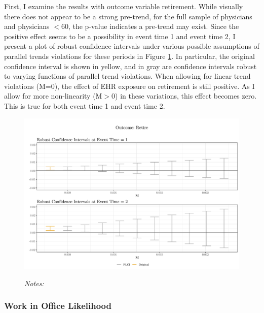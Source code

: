 \documentclass[12pt]{article}
\begin{document}
First, I examine the results with outcome variable retirement. While visually there does not appear to be a strong pre-trend, for the full sample of physicians and physicians $< 60$, the p-value indicates a pre-trend may exist. Since the positive effect seems to be a possibility in event time 1 and event time 2, I present a plot of robust confidence intervals under various possible assumptions of parallel trends violations for these periods in Figure \ref{fig:pre_retire}. In particular, the original confidence interval is shown in yellow, and in gray are confidence intervals robust to varying functions of parallel trend violations. When allowing for linear trend violations (M=0), the effect of EHR exposure on retirement is still positive. As I allow for more non-linearity (M$>$0) in these variations, this effect becomes zero. This is true for both event time 1 and event time 2. 

\begin{figure}[ht]
    \centering
    \captionsetup{width=.5\linewidth}
    \caption{}
    \includegraphics[scale=.5]{Objects/retire_pretrends_plot.pdf}
    \label{fig:pre_retire}
    \vspace{2mm}
    \caption*{\footnotesize{\textit{Notes:}}}
\end{figure}

\subsubsection{Work in Office Likelihood}
\end{document}
